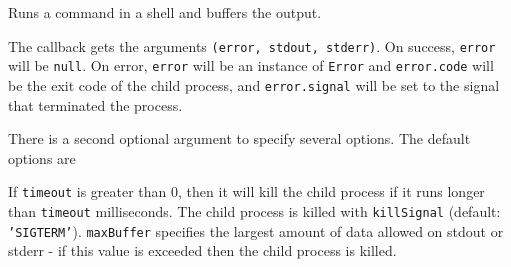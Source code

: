 Runs a command in a shell and buffers the output.

\begin{Shaded}
\begin{Highlighting}[]
 \NormalTok{(}\NormalTok{,}

\NormalTok{(}\NormalTok{,}
   
    \NormalTok{(} 
    \NormalTok{(} 
     \NormalTok{) \{}
      \NormalTok{(} 
    \NormalTok{\}}
\NormalTok{\});}
\end{Highlighting}
\end{Shaded}

The callback gets the arguments \texttt{(error, stdout, stderr)}. On
success, \texttt{error} will be \texttt{null}. On error, \texttt{error}
will be an instance of \texttt{Error} and \texttt{error.code} will be
the exit code of the child process, and \texttt{error.signal} will be
set to the signal that terminated the process.

There is a second optional argument to specify several options. The
default options are

\begin{Shaded}
\begin{Highlighting}[]
\NormalTok{\{ }\NormalTok{: }\NormalTok{,}
  \NormalTok{: }\NormalTok{,}
  \NormalTok{: }\NormalTok{*}\NormalTok{,}
  \NormalTok{: }\NormalTok{,}
  \NormalTok{: }\NormalTok{,}
  \NormalTok{: } \NormalTok{\}}
\end{Highlighting}
\end{Shaded}

If \texttt{timeout} is greater than 0, then it will kill the child
process if it runs longer than \texttt{timeout} milliseconds. The child
process is killed with \texttt{killSignal} (default:
\texttt{'SIGTERM'}). \texttt{maxBuffer} specifies the largest amount of
data allowed on stdout or stderr - if this value is exceeded then the
child process is killed.

